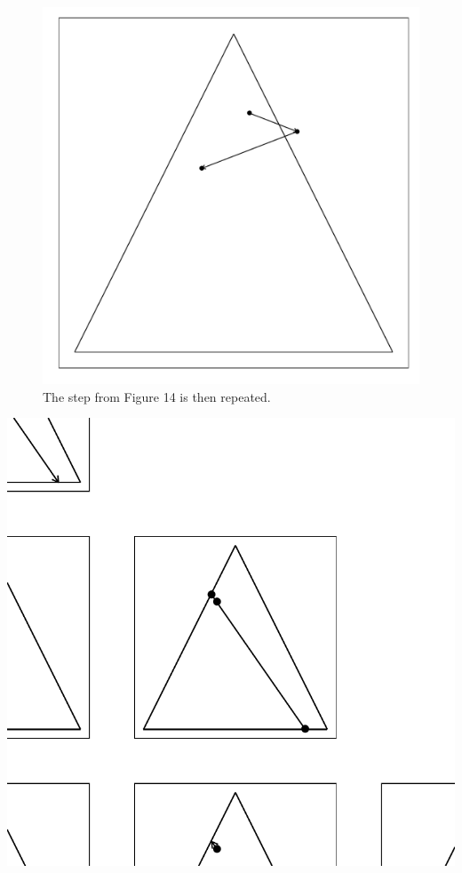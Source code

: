 \documentclass{article}\usepackage{graphicx, color}
\makeatletter
\def\maxwidth{ %
  \ifdim\Gin@nat@width>\linewidth
    \linewidth
  \else
    \Gin@nat@width
  \fi
}
\newenvironment{knitrout}{}{} %
\makeatother
\begin{document}
\begin{figure}[H]
\begin{knitrout}
\color{fgcolor}
\includegraphics[width=\maxwidth]{figure/mirror_walkthrough3} 

\end{knitrout}

\caption{The step from Figure 14 is then repeated.}
\end{figure}

\begin{knitrout}
\color{fgcolor}
\includegraphics[width=\maxwidth]{figure/hitandrun_walkthrough} 

\end{knitrout}
\end{document}
